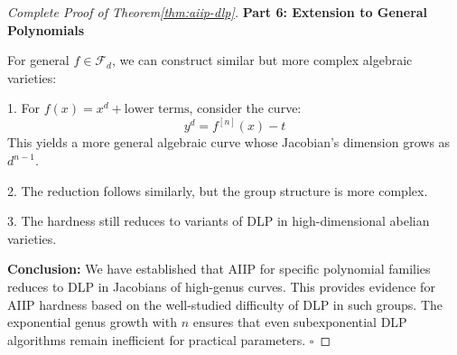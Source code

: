 \begin{proof}[Complete Proof of Theorem\ref{thm:aiip-dlp}]
    \textbf{Part 6: Extension to General Polynomials}

    For general $f \in \mathcal{F}_d$, we can construct similar but more complex algebraic 
    varieties:

    1. For $f(x) = x^d + \text{lower terms}$, consider the curve:
    $$y^d = f^{[n]}(x) - t$$
    This yields a more general algebraic curve whose Jacobian's dimension grows as 
    $d^{n-1}$.

    2. The reduction follows similarly, but the group structure is more complex.

    3. The hardness still reduces to variants of DLP in high-dimensional abelian varieties.

\textbf{Conclusion:}
    We have established that AIIP for specific polynomial families reduces to DLP in Jacobians of high-genus curves. This provides evidence for AIIP hardness based on the well-studied difficulty of DLP in such groups. The exponential genus growth with $n$ ensures that even subexponential DLP algorithms remain inefficient for practical parameters. $\square$
\end{proof}

